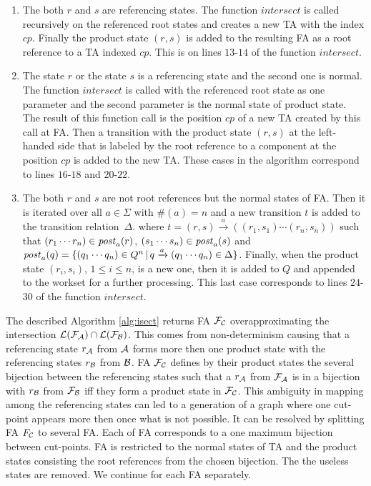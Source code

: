\begin{enumerate}
	\item The both $r$ and $s$ are referencing states.
		The function $\mathit{intersect}$ is called recursively on the referenced
		  root states and creates a new TA with the index $cp$.
		  Finally the product state $(r,s)$ is added to the resulting FA
		  as a root reference to a TA indexed $cp$.
		  This is on lines $13$-$14$ of the function $\mathit{intersect}$.
	  \item The state $r$ or the state $s$ is a referencing state and the second one is normal.
			The function $\mathit{intersect}$ is called with the referenced root state as one parameter
			and the second parameter is the normal state of product state.
    		The result of this function call is the position $cp$ of a new TA created by this call at FA.
    		Then a transition with the product state $(r,s)$ at the left-handed side
			that is labeled by the root reference to a component at the position $cp$
			is added to the new TA.
    		These cases in the algorithm correspond to lines $16$-$18$ and $20$-$22$.
	  \item The both $r$ and $s$ are not root references
			but the normal states of FA.
			Then it is iterated over all $a \in \Sigma$ with $\#(a) = n$
			and a new transition $t$ is added to the transition relation~$\Delta$.
			where $t = (r,s) \xrightarrow{a} ((r_1,s_1) \cdots (r_n, s_n))$ such that
			$(r_1 \cdots r_n) \in \mathit{post}_{a}(r)$, $(s_1 \cdots s_n) \in \mathit{post}_{a}(s)$ and
			$\mathit{post}_{a}(q) = \{(q_1 \cdots q_n) \in Q^n\,|\, q \xrightarrow{a} (q_1 \cdots q_n) \in \Delta\}$.
			Finally, when the product state $(r_i,s_i)$, $1 \leq i \leq n$, is a new one,
			then it is added to $Q$ and appended to the workset for a further processing.
			This last case corresponds to lines $24$-$30$ of the function $\mathit{intersect}$.
\end{enumerate}

The described Algorithm \ref{alg:isect} returns FA $\mathcal{F}_{\mathcal{C}}$
overapproximating the intersection $\mathcal{L}(\mathcal{F}_{\mathcal{A}}) \cap \mathcal{L}(\mathcal{F}_{\mathcal{B}})$.
This comes from non-determinism causing that a referencing state $r_{\mathcal{A}}$ from $\mathcal{A}$
forms more then one product state with the referencing states $r_{\mathcal{B}}$ from $\mathcal{B}$.
FA $\mathcal{F}_{\mathcal{C}}$ defines by their product states the several bijection between
the referencing states such that a $r_{\mathcal{A}}$ from $\mathcal{F}_{\mathcal{A}}$ is in a bijection with $r_{\mathcal{B}}$ from $\mathcal{F}_{\mathcal{B}}$ iff
they form a product state in $\mathcal{F}_{\mathcal{C}}$.
This ambiguity in mapping among the referencing states
can led to a generation of a graph where one cut-point appears more then once
what is not possible.
It can be resolved by splitting FA $F_{\mathcal{C}}$ to several FA.
Each of FA corresponds to a one maximum bijection between cut-points.
FA is restricted to the normal states of TA and the product states
consisting the root references from the chosen bijection.
The the useless states are removed.
We continue for each FA separately.

